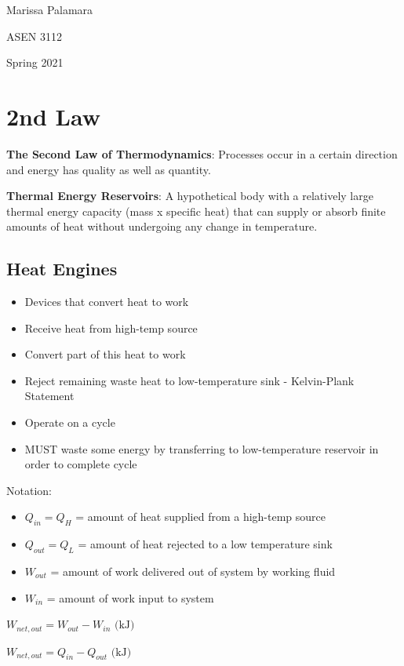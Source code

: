 \documentclass{article}
\begin{document}
\begin{multicols*}{3}
    Marissa Palamara\par 
    ASEN 3112\par 
    Spring 2021
    \section*{2nd Law}
    \textbf{The Second Law of Thermodynamics}: Processes occur in a certain direction and energy has quality as well as quantity.\par
    \textbf{Thermal Energy Reservoirs}: A hypothetical body with a relatively large thermal energy capacity (mass x specific heat) that can supply or absorb finite amounts of heat without undergoing any change in temperature. 
    \subsection*{Heat Engines}
    \begin{itemize}
        \item Devices that convert heat to work
        \item Receive heat from high-temp source
        \item Convert part of this heat to work
        \item Reject remaining waste heat to low-temperature sink - Kelvin-Plank Statement
        \item Operate on a cycle
        \item MUST waste some energy by transferring to low-temperature reservoir in order to complete cycle
    \end{itemize}
    Notation:
    \begin{itemize}
        \item $Q_{in}=Q_H$ = amount of heat supplied from a high-temp source
        \item $Q_{out}=Q_L$ = amount of heat rejected to a low temperature sink
        \item $W_{out}$ = amount of work delivered out of system by working fluid
        \item $W_{in}$ = amount of work input to system
    \end{itemize}
    $W_{net,out}=W_{out}-W_{in}\text{ (kJ)}$\par 
    $W_{net,out}=Q_{in}-Q_{out}\text{ (kJ)}$

\end{multicols*}
\end{document}
